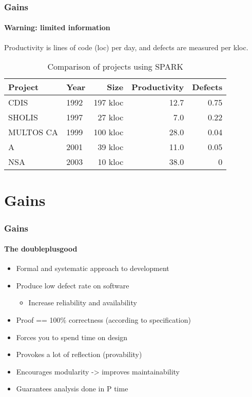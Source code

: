 \documentclass[presentation]{beamer}   %
\begin{document}
\begin{frame}
  \frametitle{Gains}
  \framesubtitle{Warning: limited information}
  Productivity is lines of code (loc) per day, and defects are measured per kloc.
\begin{table}[h]
\centering
    \begin{tabular}{ | l | l | r | r | r |}
    \hline
    Project & Year & Size & Productivity & Defects \\ \hline 
    \hline
    CDIS      & 1992 & 197 kloc & 12.7 & 0.75 \\ \hline
    SHOLIS    & 1997 &  27 kloc &  7.0 & 0.22 \\ \hline
    MULTOS CA & 1999 & 100 kloc & 28.0 & 0.04 \\ \hline
    A         & 2001 &  39 kloc & 11.0 & 0.05 \\ \hline
    NSA       & 2003 &  10 kloc & 38.0 & 0 \\ \hline        
    \end{tabular}
\caption{Comparison of projects using SPARK}
\label{table:spark_projects_comparison}
\end{table}      
\end{frame}

\section{Gains}
\begin{frame}
  \frametitle{Gains}
  \framesubtitle{The doubleplusgood}
  \begin{itemize}
        \item Formal and systematic approach to development
        \item Produce low defect rate on software
        \begin{itemize}
          \item Increase reliability and availability
        \end{itemize}
        \item Proof == 100\% correctness (according to specification)
        \item Forces you to spend time on design
        \item Provokes a lot of reflection (provability)
        \item Encourages modularity -> improves maintainability
        \item Guarantees analysis done in P time
      \end{itemize}       
\end{frame}
\end{document}
